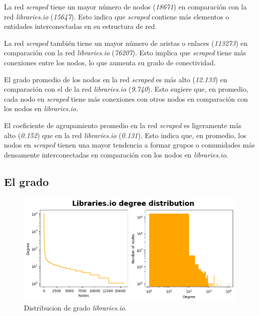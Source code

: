La red \textit{scraped} tiene un mayor número de nodos (\textit{18671}) en comparación con la
red \textit{libraries.io} (\textit{15647}). Esto indica que \textit{scraped} contiene más elementos o entidades
interconectadas en su estructura de red.

La red \textit{scraped} también tiene un mayor número de aristas o enlaces (\textit{113273}) en
comparación con la red \textit{libraries.io} (\textit{76207}). Esto implica que \textit{scraped} tiene más
conexiones entre los nodos, lo que aumenta su grado de conectividad.

El grado promedio de los nodos en la red \textit{scraped} es más alto (\textit{12.133}) en
comparación con el de la red \textit{libraries.io} (\textit{9.740}). Esto sugiere que, en promedio, cada nodo
en \textit{scraped} tiene más conexiones con otros nodos en comparación con los nodos en \textit{libraries.io}.

El coeficiente de agrupamiento promedio en la red \textit{scraped} es
ligeramente más alto (\textit{0.152}) que en la red \textit{libraries.io} (\textit{0.131}). Esto indica que,
en promedio, los nodos en \textit{scraped} tienen una mayor tendencia a formar grupos o comunidades más densamente
interconectadas en comparación con los nodos en \textit{libraries.io}.

\subsection{El grado}

\begin{figure}[ht!]
    \begin{center}
        \includegraphics[width=1\textwidth]{img/cran/distribucion_grado.png}
        \caption{Distribucion de grado \textit{libraries.io}.}
        \label{fig:cran_degree_distribution}
    \end{center}
\end{figure}

